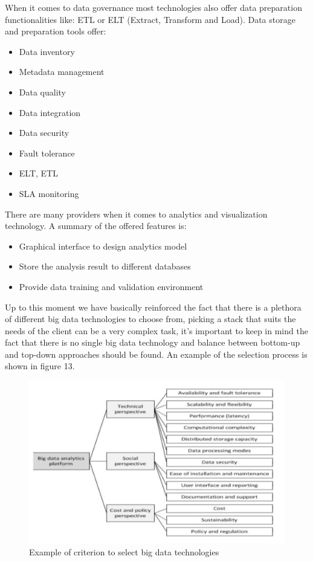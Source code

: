 When it comes to data governance most technologies also offer data preparation functionalities like: ETL or ELT (Extract, Transform and Load). \n
Data storage and preparation tools offer:
\begin{itemize}
    \item Data inventory
    \item Metadata management
    \item Data quality
    \item Data integration
    \item Data security
    \item Fault tolerance
    \item ELT, ETL
    \item SLA monitoring
\end{itemize}
There are many providers when it comes to analytics and visualization technology. A summary of the offered features is:
\begin{itemize}
    \item Graphical interface to design analytics model
    \item Store the analysis result to different databases
    \item Provide data training and validation environment
\end{itemize}
Up to this moment we have basically reinforced the fact that there is a plethora of different big data technologies to choose from, picking a stack that suits the needs of the client can be a very complex task, it's important to keep in mind the fact that there is no single big data technology and balance between bottom-up and top-down approaches should be found. An example of the selection process is shown in figure 13.
\begin{figure}
    \centering
    \includegraphics[scale=0.2]{img/tech_selection_process.jpeg}
    \caption{Example of criterion to select big data technologies}
\end{figure}

